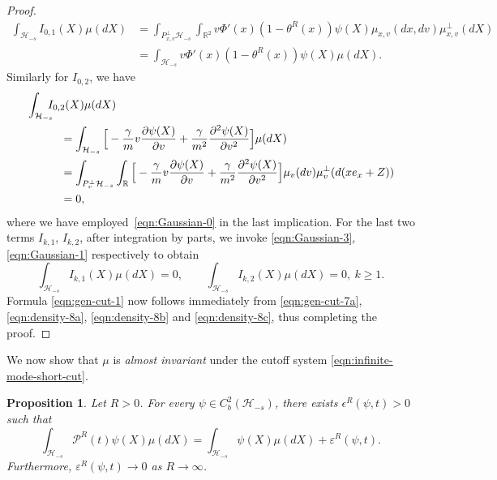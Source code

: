 \documentclass[11pt]{amsart}
\theoremstyle{definition}
\newcommand{\rbb}{\mathbb{R}}
\renewcommand{\H}{\mathcal{H}}
\newcommand{\PMarkov}{\mathcal{P}}
\theoremstyle{definition}
\theoremstyle{plain}
\newtheorem{proposition}[theorem]{Proposition}
\numberwithin{equation}{section}
\begin{document}
\begin{proof}
\begin{equation}
\begin{aligned}
\int_{\mathcal{H}_{-s}}\!\!\!\!I_{0,1}(X)\mu(dX)
& =  \int_{P_{x,v}^\perp\H_{-s}}\int_{\rbb^2}v\Phi'(x)\left(1-\theta^R(x)\right)\psi(X)\mu_{x,v}(dx,dv)\mu_{ x,v}^\perp(dX)\\
&=\int_{\mathcal{H}_{-s}}\!\!\!\!v\Phi'(x)\left(1-\theta^R(x)\right)\psi(X)\mu(dX).
\end{aligned}
\end{equation}
Similarly for $I_{0,2}$, we have
\begin{equation}\label{eqn:density-8b}
\begin{aligned}
\MoveEqLeft[3]
\int_{\mathcal{H}_{-s}}\!\!\!\!I_{0,2}(X)\mu(dX)\\
& = \int_{\mathcal{H}_{-s}} \Big[-\frac{\gamma}{m}v\frac{\partial \psi(X)}{\partial v}+\frac{\gamma}{m^2}\frac{\partial ^2\psi(X)}{\partial v^2}\Big]\mu(dX)\\
&= \int_{P_{v}^\perp\H_{-s}}\int_{\rbb} \Big[-\frac{\gamma}{m}v\frac{\partial \psi(X)}{\partial v}+\frac{\gamma}{m^2}\frac{\partial ^2\psi(X)}{\partial v^2}\Big]\mu_{v}(dv)\mu_{v}^\perp(d(xe_x+Z))\\
&=0,
\end{aligned}
\end{equation}
where we have employed~\eqref{eqn:Gaussian-0} in the last implication. For the last two terms $I_{k,1}$, $I_{k,2}$, after integration by parts, we invoke \eqref{eqn:Gaussian-3}, \eqref{eqn:Gaussian-1} respectively to obtain
\begin{equation}\label{eqn:density-8c}
\int_{\mathcal{H}_{-s}}\!\!\!\!I_{k,1}(X)\mu(dX)=0,\qquad\int_{\mathcal{H}_{-s}}\!\!\!\!I_{k,2}(X)\mu(dX)=0,\ k\geq 1.
\end{equation}
Formula \eqref{eqn:gen-cut-1} now follows immediately from \eqref{eqn:gen-cut-7a}, \eqref{eqn:density-8a}, \eqref{eqn:density-8b} and \eqref{eqn:density-8c}, thus completing the proof.
\end{proof}
We now show that $\mu$ is \emph{almost invariant} under the cutoff system \eqref{eqn:infinite-mode-short-cut}. 
\begin{proposition} \label{prop:density-cut} Let $R>0$.  For every $\psi\in C^2_b(\H_{-s})$, there exists $\epsilon^R(\psi,t)>0$ such that
\begin{equation}\label{eqn:density-cut-1}
\int_{\mathcal{H}_{-s}}\!\!\!\!\PMarkov^R(t)\psi(X)\mu(dX)=\int_{\mathcal{H}_{-s}}\!\!\!\!\psi(X)\mu(dX)+\varepsilon^R(\psi,t).
\end{equation}
Furthermore, $\varepsilon^R(\psi,t)\to 0$ as $R\to\infty$.
\end{proposition}
\end{document}
